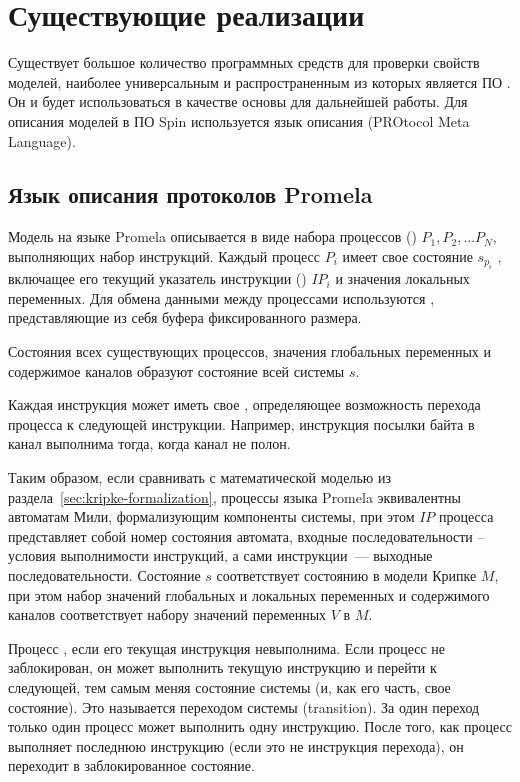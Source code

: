 
\section{Существующие реализации }
\label{sec:analogues}

Существует большое количество программных средств для проверки свойств моделей, наиболее
универсальным и распространенным из которых является ПО  \cite{SpinRoot}. Он и
будет использоваться в качестве основы для дальнейшей работы. Для описания моделей в ПО
Spin используется язык описания  (PROtocol Meta Language).

\subsection{Язык описания протоколов Promela}
\label{sec:promela}

Модель на языке Promela описывается в виде набора процессов () $P_1, P_2,
... P_N$, выполняющих набор инструкций. Каждый процесс $P_i$ имеет свое состояние
$s_{p_i}$ , включащее его текущий указатель инструкции () $IP_i$
и значения локальных переменных. Для обмена данными между процессами используются
, представляющие из себя буфера фиксированного размера.

Состояния всех существующих процессов, значения глобальных переменных и содержимое каналов
образуют состояние всей системы $s$.

Каждая инструкция может иметь свое , определяющее возможность
перехода процесса к следующей инструкции. Например, инструкция посылки байта в канал
выполнима тогда, когда канал не полон.

Таким образом, если сравнивать с математической моделью из
раздела~\ref{sec:kripke-formalization}, процессы языка Promela эквивалентны автоматам
Мили, формализующим компоненты системы, при этом $IP$ процесса представляет собой номер
состояния автомата, входные последовательности -- условия выполнимости инструкций, а сами
инструкции~--- выходные последовательности. Состояние $s$ соответствует состоянию в модели
Крипке $M$, при этом набор значений глобальных и локальных переменных и содержимого
каналов соответствует набору значений переменных $V$ в $M$.

Процесс , если его текущая инструкция невыполнима. Если процесс не
заблокирован, он может выполнить текущую инструкцию и перейти к следующей, тем самым меняя
состояние системы (и, как его часть, свое состояние). Это называется переходом системы
(transition). За один переход только один процесс может выполнить одну инструкцию. После
того, как процесс выполняет последнюю инструкцию (если это не инструкция перехода), он
переходит в заблокированное состояние.

